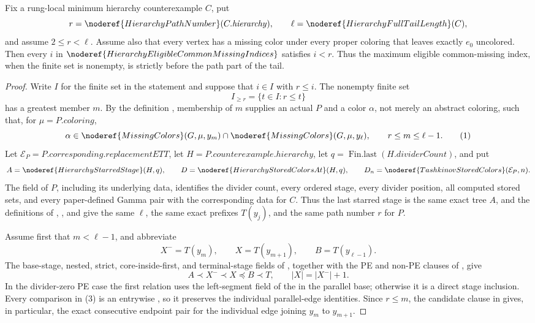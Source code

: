 \begin{lemma}
Fix a rung-local minimum hierarchy counterexample \(C\), put
\[
 r=\noderef{HierarchyPathNumber}(C.\mathit{hierarchy}),\qquad
 \ell=\noderef{HierarchyFullTailLength}(C),
\]
and assume \(2\le r<\ell\).  Assume also that every vertex has a missing
color under every proper coloring that leaves exactly \(e_0\) uncolored.
Then every \(i\) in
\(\noderef{HierarchyEligibleCommonMissingIndices}\) satisfies \(i<r\).
Thus the maximum eligible common-missing index, when the finite set is
nonempty, is strictly before the path part of the tail.
\end{lemma}
\begin{proof}
Write \(I\) for the finite set in the statement and suppose that
\(i\in I\) with \(r\leq i\).  The nonempty finite set
\[
                   I_{\geq r}=\{t\in I:r\leq t\}
\]
has a greatest member \(m\).  By the definition
, membership of \(m\)
supplies an actual  \(P\) and a
color \(\alpha\), not merely an abstract coloring, such that, for
\(\mu=P.\mathit{coloring}\),
\[
 \alpha\in\noderef{MissingColors}(G,\mu,y_m)\cap
              \noderef{MissingColors}(G,\mu,y_\ell),\qquad
                         r\leq m\leq\ell-1.                    \tag{1}
\]
Let \(\mathcal E_P=P.\mathit{corresponding}.\mathit{replacementETT}\),
let \(H=P.\mathit{counterexample}.\mathit{hierarchy}\), let
\(q=\operatorname{Fin.last}(H.\mathit{dividerCount})\), and put
\[
 A=\noderef{HierarchyStarredStage}(H,q),\qquad
 D=\noderef{HierarchyStoredColorsAt}(H,q),\qquad
 D_n=\noderef{TashkinovStoredColors}(\mathcal E_P,n).
\]
The  field of \(P\), including its underlying
 data, identifies the divider count, every
ordered stage, every divider position, all computed stored sets, and every
paper-defined Gamma pair with the corresponding data for \(C\).  Thus the
last starred stage is the same exact tree \(A\), and the definitions of
, , and
 give the same \(\ell\), the same exact
prefixes \(T(y_j)\), and the same path number \(r\) for \(P\).

Assume first that \(m<\ell-1\), and abbreviate
\[
 X^-=T(y_m),\qquad X=T(y_{m+1}),\qquad B=T(y_{\ell-1}).          \tag{2}
\]
The base-stage, nested, strict, core-inside-first, and terminal-stage fields
of , together with the PE and non-PE clauses of
, give
\[
 A\prec X^-\prec X\preccurlyeq B\prec T,\qquad |X|=|X^-|+1.    \tag{3}
\]
In the divider-zero PE case the first relation uses the left-segment field
of the  in the parallel base; otherwise it is a
direct stage inclusion.  Every comparison in (3) is an entrywise
, so it preserves the individual
parallel-edge identities.  Since \(r\leq m\), the candidate clause in
 gives, in particular, the exact consecutive
endpoint pair for the individual edge joining \(y_m\) to \(y_{m+1}\).


\end{proof}
